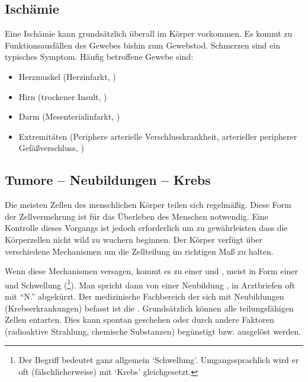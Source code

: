 \subsection{Ischämie}
\label{topic:ischaemie}

 Eine Ischämie kann
grundsätzlich überall im Körper vorkommen. Es kommt zu
Funktionsausfällen des Gewebes bishin zum Gewebstod.
Schmerzen sind ein typisches Symptom. Häufig betroffene
Gewebe sind:

\begin{itemize}
  \item Herzmuskel (Herzinfarkt,
  )
  \item Hirn (trockener Insult,
  )
  \item Darm (Mesenterialinfarkt,
  )
  \item Extremitäten (Periphere arterielle
  Verschlusskrankheit, arterieller peripherer
  Gefäßverschluss,
  )
\end{itemize}


\subsection{Tumore -- Neubildungen -- Krebs}
\label{topic:tumor}


Die meisten Zellen des menschlichen Körper teilen sich
regelmäßig. Diese Form der Zellvermehrung ist für das
Überleben des Menschen notwendig. Eine Kontrolle dieses
Vorgangs ist jedoch erforderlich um zu gewährleisten dass
die Körperzellen nicht wild zu wuchern beginnen. Der Körper
verfügt über verschiedene Mechanismen um die Zellteilung im
richtigen Maß zu halten. 

Wenn diese Mechanismen versagen, kommt es zu einer
 und , meist in Form einer
 und Schwellung (\footnote{Der
Begriff  bedeutet ganz allgemein
\enquote*{Schwellung}. Umgangssprachlich wird er oft
(fälschlicherweise) mit \enquote*{Krebs} gleichgesetzt.}).
Man spricht dann von einer Neubildung , in
Arztbriefen oft mit \enquote{{\ttfamily N.}} abgekürzt. Der
medizinische Fachbereich der sich mit Neubildungen
(Krebserkrankungen) befasst ist die .
Grundsätzlich können alle teilungsfähigen Zellen entarten.
Dies kann spontan geschehen oder durch andere Faktoren
(radioaktive Strahlung, chemische Substanzen) begünstigt
bzw. ausgelöst werden.

